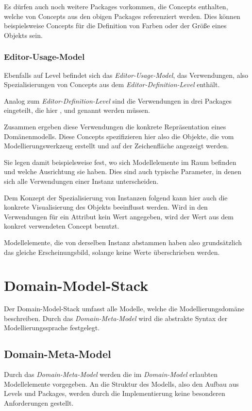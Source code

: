 \documentclass[a4paper,10pt]{sphinxmanual}
\begin{document}
Es dürfen auch noch weitere Packages vorkommen, die Concepts enthalten, welche von Concepts aus den obigen Packages referenziert werden.
Dies können beispielsweise Concepts für die Definition von Farben oder der Größe eines Objekts sein.


\subsubsection{Editor-Usage-Model}
\label{modellhierarchie:euse}\label{modellhierarchie:editor-usage-model}
Ebenfalls auf Level  befindet sich das \emph{Editor-Usage-Model}, das Verwendungen, also Spezialisierungen von Concepts aus dem \emph{Editor-Definition-Level} enthält.

Analog zum \emph{Editor-Definition-Level} sind die Verwendungen in drei Packages eingeteilt, die hier ,  und  genannt werden müssen.

Zusammen ergeben diese Verwendungen die konkrete Repräsentation eines Domänenmodells.
Diese Concepts spezifizieren hier also die Objekte, die vom Modellierungswerkzeug erstellt und auf der Zeichenfläche angezeigt werden.

Sie legen damit beispielsweise fest, wo sich Modellelemente im Raum befinden und welche Ausrichtung sie haben.
Dies sind auch typische Parameter, in denen sich alle Verwendungen einer Instanz unterscheiden.

Dem Konzept der Spezialisierung von Instanzen folgend kann hier auch die konkrete Visualisierung des Objekts beeinflusst werden.
Wird in den Verwendungen für ein Attribut kein Wert angegeben, wird der Wert aus dem konkret verwendeten Concept benutzt.

Modellelemente, die von derselben Instanz abstammen haben also grundsätzlich das gleiche Erscheinungsbild, solange keine Werte überschrieben werden.


\section{Domain-Model-Stack}
\label{modellhierarchie:domain-model-stack}\label{modellhierarchie:id5}
Der Domain-Model-Stack umfasst alle Modelle, welche die Modellierungsdomäne beschreiben.
Durch das \emph{Domain-Meta-Model} wird die abstrakte Syntax der Modellierungssprache festgelegt.


\subsection{Domain-Meta-Model}
\label{modellhierarchie:domain-meta-model}
Durch das \emph{Domain-Meta-Model} werden die im \emph{Domain-Model} erlaubten Modellelemente vorgegeben.
An die Struktur des Modells, also den Aufbau aus Levels und Packages, werden durch die Implementierung keine besonderen Anforderungen gestellt.
\end{document}
